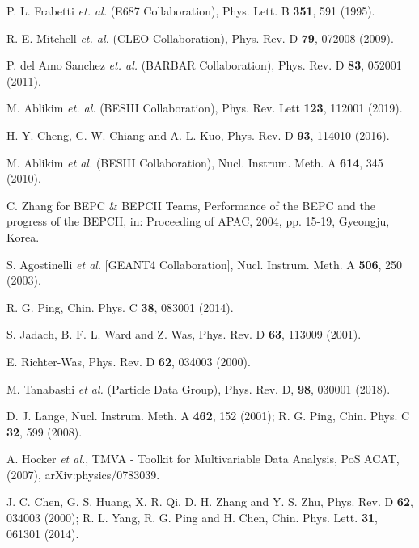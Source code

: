 
\begin{thebibliography}{99}

        P. L. Frabetti {\it et. al.} (E687 Collaboration),
        Phys. Lett. B \textbf{351}, 591 (1995).

        R. E. Mitchell {\it et. al.}  (CLEO Collaboration),
        Phys. Rev. D \textbf{79}, 072008 (2009).

        P. del Amo Sanchez {\it et. al.} (BARBAR Collaboration),
        Phys. Rev. D \textbf{83}, 052001 (2011).

        M. Ablikim {\it et. al.} (BESIII Collaboration),
        Phys. Rev. Lett \textbf{123}, 112001 (2019).

        H. Y. Cheng, C. W. Chiang and A. L. Kuo,
        Phys. Rev. D \textbf{93}, 114010 (2016).

     M. Ablikim {\it et al.} (BESIII Collaboration), Nucl. Instrum. Meth. A {\bf 614}, 345 (2010).

     C. Zhang for BEPC \& BEPCII Teams, Performance of the BEPC and the progress of the BEPCII, in: Proceeding of APAC, 2004, pp. 15-19, Gyeongju, Korea. 

     S. Agostinelli {\it et al.} [GEANT4 Collaboration], Nucl. Instrum. Meth. A {\bf 506}, 250 (2003).

     R. G. Ping, Chin. Phys. C {\bf 38}, 083001 (2014).

     S. Jadach, B. F. L. Ward and Z. Was, Phys. Rev. D {\bf 63}, 113009 (2001). 

     E. Richter-Was, Phys. Rev. D {\bf 62}, 034003 (2000). 

     M. Tanabashi {\it et al.} (Particle Data Group), Phys. Rev. D, {\bf 98}, 030001 (2018).

     D. J. Lange, Nucl. Instrum. Meth. A {\bf 462}, 152 (2001); R. G. Ping, Chin. Phys. C {\bf 32}, 599 (2008).

     A. Hocker {\it et al.}, TMVA - Toolkit for Multivariable Data Analysis, PoS ACAT, (2007), arXiv:physics/0783039.

     J. C. Chen, G. S. Huang, X. R. Qi, D. H. Zhang and Y. S. Zhu, Phys. Rev. D {\bf 62}, 034003 (2000); R. L. Yang, R. G. Ping and H. Chen, Chin. Phys. Lett. {\bf 31}, 061301 (2014).


\end{thebibliography}
